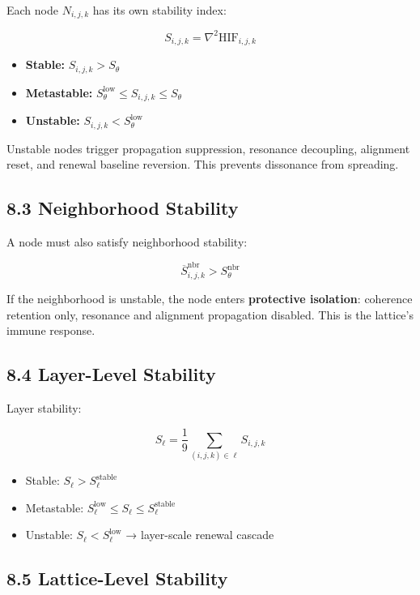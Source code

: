 Each node \(N_{i,j,k}\) has its own stability index:

\[
S_{i,j,k} = \nabla^2 \mathrm{HIF}_{i,j,k}
\]

\begin{itemize}
\tightlist
\item
  \textbf{Stable:} \(S_{i,j,k} > S_{\theta}\)
\item
  \textbf{Metastable:} \(S_{\theta}^{\text{low}} \le S_{i,j,k} \le S_{\theta}\)
\item
  \textbf{Unstable:} \(S_{i,j,k} < S_{\theta}^{\text{low}}\)
\end{itemize}

Unstable nodes trigger propagation suppression, resonance decoupling, alignment reset, and renewal baseline reversion. This prevents dissonance from spreading.

\subsection{8.3 Neighborhood Stability}\label{neighborhood-stability}

A node must also satisfy neighborhood stability:

\[
\overline{S}^{\text{nbr}}_{i,j,k} > S_{\theta}^{\text{nbr}}
\]

If the neighborhood is unstable, the node enters \textbf{protective isolation}: coherence retention only, resonance and alignment propagation disabled. This is the lattice's immune response.

\subsection{8.4 Layer-Level Stability}\label{layer-level-stability}

Layer stability:

\[
S_{\ell} = \frac{1}{9} \sum_{(i,j,k)\in\ell} S_{i,j,k}
\]

\begin{itemize}
\tightlist
\item
  Stable: \(S_{\ell} > S_{\ell}^{\text{stable}}\)
\item
  Metastable: \(S_{\ell}^{\text{low}} \le S_{\ell} \le S_{\ell}^{\text{stable}}\)
\item
  Unstable: \(S_{\ell} < S_{\ell}^{\text{low}}\) → layer-scale renewal cascade
\end{itemize}

\subsection{8.5 Lattice-Level Stability}\label{lattice-level-stability}

